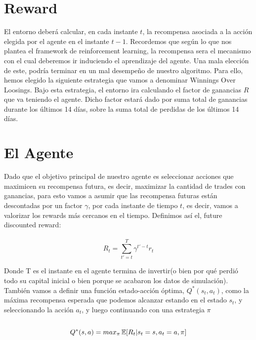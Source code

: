 \section{Reward}

El entorno deberá calcular, en cada instante $t$, la recompensa asociada a la acción elegida por el agente en el instante $t-1$. Recordemos que según lo que nos plantea el framework de reinforcement learning, la recompensa sera el mecanismo con el cual deberemos ir induciendo el aprendizaje del agente. Una mala elección de este, podría terminar en un mal desempeño de nuestro algoritmo. Para ello, hemos elegido la siguiente estrategia que vamos a denominar Winnings Over Loosings. Bajo esta estrategia, el entorno ira calculando el factor de ganancias $R$ que va teniendo el agente. Dicho factor estará dado por suma total de ganancias durante los últimos 14 días, sobre la suma total de perdidas de los últimos 14 días.

\section{El Agente}

Dado que el objetivo principal de nuestro agente es seleccionar acciones que maximicen su recompensa futura, es decir, maximizar la cantidad de trades con ganancias, para esto vamos a asumir que las recompensa futuras están descontadas por un factor $\gamma$, por cada instante de tiempo $t$, es decir, vamos a valorizar los rewards más cercanos en el tiempo. Definimos así el, future discounted reward:
\\\\
\begin{equation}
	 R_t = \sum\limits_{t'= t}^T  \gamma^{t'-t} r_t
\end{equation}

Donde T es el instante en el agente termina de invertir(o bien por qué perdió todo su capital inicial o bien porque se acabaron los datos de simulación).\\
También vamos a definir una función estado-acción óptima, $Q^*(s_t, a_t)$, como la máxima recompensa esperada que podemos alcanzar estando en el estado $s_t$, y seleccionando la acción $a_t$, y luego continuando con una estrategia $\pi$
\\\\
\begin{equation}
Q^*(s, a) = max_{\pi} \operatorname{\mathbb{E}} [R_t  |  s_t = s, a_t = a, \pi]
\end{equation}
\\


